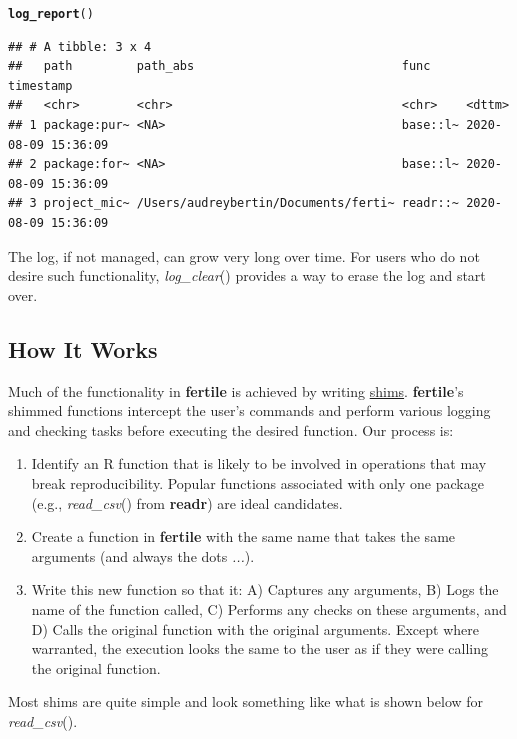 \documentclass[APA,LATO1COL]{WileyNJD-v2}\usepackage[]{graphicx}\usepackage[]{color}
\makeatletter
\newcommand{\hlstd}[1]{\textcolor[rgb]{0.345,0.345,0.345}{#1}}%
\newcommand{\hlkwd}[1]{\textcolor[rgb]{0.737,0.353,0.396}{\textbf{#1}}}%
\newenvironment{kframe}{%
 \def\at@end@of@kframe{}%
 \ifinner\ifhmode%
  \def\at@end@of@kframe{\end{minipage}}%
  \begin{minipage}{\columnwidth}%
 \fi\fi%
 \def\FrameCommand##1{\hskip\@totalleftmargin \hskip-\fboxsep
 \colorbox{shadecolor}{##1}\hskip-\fboxsep
     \hskip-\linewidth \hskip-\@totalleftmargin \hskip\columnwidth}%
 \MakeFramed {\advance\hsize-\width
   \@totalleftmargin\z@ \linewidth\hsize
   \@setminipage}}%
 {\par\unskip\endMakeFramed%
 \at@end@of@kframe}
\newenvironment{knitrout}{}{} %
\newcommand{\R}{\textsf{R}\xspace}
\newcommand{\cmd}[1]{\textit{#1}}
\newcommand{\pkg}[1]{\textbf{#1}}
\newcommand{\func}[1]{\textit{#1}()}
\makeatother
\begin{document}
\begin{knitrout}
\color{fgcolor}\begin{kframe}
\begin{alltt}
\hlkwd{log_report}\hlstd{()}
\end{alltt}
\begin{verbatim}
## # A tibble: 3 x 4
##   path         path_abs                             func     timestamp          
##   <chr>        <chr>                                <chr>    <dttm>             
## 1 package:pur~ <NA>                                 base::l~ 2020-08-09 15:36:09
## 2 package:for~ <NA>                                 base::l~ 2020-08-09 15:36:09
## 3 project_mic~ /Users/audreybertin/Documents/ferti~ readr::~ 2020-08-09 15:36:09
\end{verbatim}
\end{kframe}
\end{knitrout}

The log, if not managed, can grow very long over time. For users who do not desire such functionality, \func{log\_clear} provides a way to erase the log and start over.




\subsection{How It Works}

Much of the functionality in \pkg{fertile} is achieved by writing \href{https://en.wikipedia.org/wiki/Shim_(computing)}{shims}. \pkg{fertile}'s shimmed functions intercept the user's commands and perform various logging and checking tasks before executing the desired function. Our process is:

\begin{enumerate}[noitemsep]
\item Identify an \R function that is likely to be involved in operations that may break reproducibility. Popular functions associated with only one package (e.g., \func{read\_csv} from \pkg{readr}) are ideal candidates.
\item Create a function in \pkg{fertile} with the same name that takes the same arguments (and always the dots \cmd{...}).
\item Write this new function so that it: A) Captures any arguments, B) Logs the name of the function called, C) Performs any checks on these arguments, and D) Calls the original function with the original arguments. Except where warranted, the execution looks the same to the user as if they were calling the original function.
\end{enumerate}
Most shims are quite simple and look something like what is shown below for \func{read\_csv}. 
\end{document}
